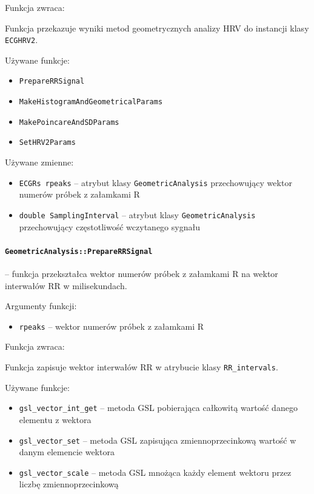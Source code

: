 \documentclass[a4paper, 11pt]{article}
\begin{document}
Funkcja zwraca:

Funkcja przekazuje wyniki metod geometrycznych analizy HRV do instancji
klasy \verb+ECGHRV2+.

\medskip{}


Używane funkcje:
\begin{itemize}
\item \verb+PrepareRRSignal+
\item \verb+MakeHistogramAndGeometricalParams+
\item \verb+MakePoincareAndSDParams+
\item \verb+SetHRV2Params+\medskip{}

\end{itemize}
Używane zmienne:
\begin{itemize}
\item \verb+ECGRs rpeaks+ -- atrybut klasy \verb+GeometricAnalysis+ przechowujący wektor
numerów próbek z załamkami R
\item \verb+double SamplingInterval+ -- atrybut klasy \verb+GeometricAnalysis+ przechowujący
częstotliwość wczytanego sygnału
\end{itemize}


\medskip{}

\paragraph{\texttt{GeometricAnalysis::PrepareRRSignal}} -- funkcja przekształca wektor numerów próbek z załamkami R na wektor
interwałów RR w milisekundach.

\medskip{}


Argumenty funkcji:
\begin{itemize}
\item \verb+rpeaks+ -- wektor numerów próbek z załamkami R
\end{itemize}
\medskip{}


Funkcja zwraca:

Funkcja zapisuje wektor interwałów RR w atrybucie klasy \verb+RR_intervals+.

\medskip{}


Używane funkcje:
\begin{itemize}
\item \verb+gsl_vector_int_get+ -- metoda GSL pobierająca całkowitą wartość danego
elementu z wektora
\item \verb+gsl_vector_set+ -- metoda GSL zapisująca zmiennoprzecinkową wartość
w danym elemencie wektora
\item \verb+gsl_vector_scale+ -- metoda GSL mnożąca każdy element wektoru przez
liczbę zmiennoprzecinkową
\end{itemize}
\medskip{}
\end{document}
